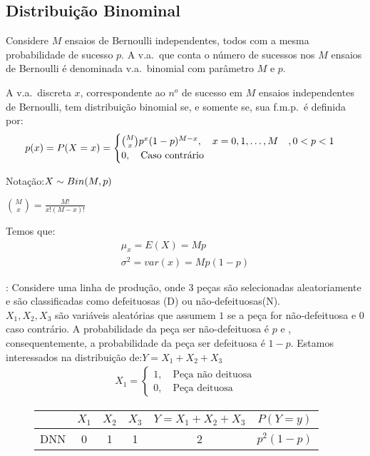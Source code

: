  \subsection{Distribuição Binominal}

 \begin{description}
   \item  Considere $M$ ensaios de Bernoulli independentes, todos com a mesma probabilidade
 de sucesso $p$. A v.a.\ que conta o número de sucessos nos $M$ ensaios de Bernoulli
 é denominada v.a.\ binomial com parâmetro $M$ e $p$.

   \item[Definição:] A v.a.\ discreta $x$, correspondente ao $n^o$ de sucesso em $M$ ensaios
     independentes de Bernoulli, tem distribuição binomial se, e somente se, sua 
     f.m.p.\ é definida por: 
     \begin{align}
       p(x)=P(X=x)=\begin{cases}
         \binom{M}{x}p^x (1-p)^{M-x}, \text{\quad}x=0,1,\dots,M  \quad  ,0<p<1\\
         0, \text{\quad Caso contrário}
       \end{cases}
     \end{align}

   \item{Notação}:$ X \sim Bin(M,p)\\$
   \item     [Obs:] $\binom{M}{x}=\frac{M!}{x!(M-x)!}$

     Temos que: 
     \begin{align}
       \mu_{x}=E(X)=Mp \\
       \sigma^2 =var(x)=Mp(1-p)
     \end{align}
   \item[Exemplo]: Considere uma linha de produção, onde 3 peças são selecionadas aleatoriamente
     e são classificadas como defeituosas (D) ou não-defeituosas(N).\\
     $X_{1},X_{2},X_{3}$ são variáveis aleatórias que assumem $1$ se a peça for não-defeituosa e $0$ caso 
     contrário. A probabilidade da peça ser não-defeituosa é $p$ e , consequentemente, 
     a probabilidade da peça ser defeituosa é $1-p$. Estamos interessados na distribuição
     de:$Y=X_{1}+X_{2}+X_{3}$
     \begin{align*}
       X_1 = \begin{cases}
         1, \quad \text{Peça não deituosa}\\
         0, \quad \text{Peça deituosa}
       \end{cases}
     \end{align*}
     \begin{figure}[H]
       \centering
       
       \label{fig:}
     \end{figure}
     \begin{figure}[H]
     \begin{tabular}{c c c c c c }
       \toprule
       & $X_1$  & $X_2$ & $X_3$   & $Y= X_1 +X_2+ X_3$ & $ P(Y=y)$\\ \midrule
       DNN &0 & 1 & 1 & 2 & $p^2(1-p)$\\\midrule


\end{tabular}
\end{figure}
\end{description}
